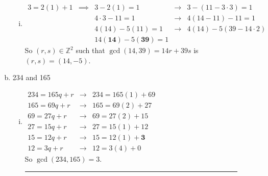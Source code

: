 \documentclass{article}
\begin{document}
\begin{description}
\begin{enumerate}[(a)]
\begin{enumerate}[(i)]
					
					\item$\begin{array}{ccccc}
						3=2(1)+1&  \implies&  3-2(1)=1&  \to&  3-(11-3\cdot3)=1\\ 
						&  &  4\cdot3-11=1&  \to&  4(14-11)-11=1\\ 
						&  &  4(14)-5(11)=1&  \to&  4(14)-5(39-14\cdot2)\\ 
						&  &  14(\mathbf{14})-5(\mathbf{39})=1&  & 
					\end{array}$ \\ So $(r,s)\in\mathbb{Z}^2$ such that $\gcd(14,39)=14r+39s$ is $(r,s)=(14,-5)$.  
				\end{enumerate}
			\item 234 and 165
			\begin{enumerate}[(i)]
				\item
				$\begin{array}{ccc}
					234=165q+r&  \to&  234=165(1)+69\\ 
					165=69q+r&  \to&  165=69(2)+27\\ 
					69=27q+r&  \to&  69=27(2)+15\\ 
					27=15q+r&  \to&  27=15(1)+12\\ 
					15=12q+r&  \to&  15=12(1)+\mathbf{3}\\ 
					12=3q+r&  \to& 12=3(4)+0
				\end{array}$  \\ So $\gcd{(234,165)}=3$.\\ \noindent\rule{10cm}{0.4pt}
				

\end{enumerate}
\end{enumerate}
\end{description}
\end{document}
